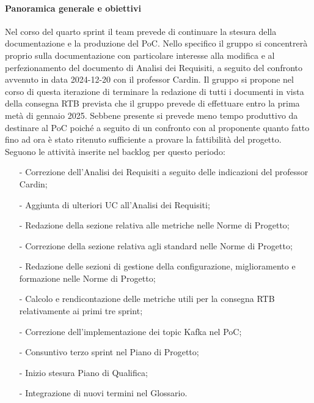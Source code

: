 \documentclass[10pt]{article}
\begin{document}
{{{{{    \paragraph{Panoramica generale e obiettivi}\mbox{}\vspace{0.4em}

    Nel corso del quarto sprint il team prevede di continuare la stesura della documentazione e la produzione del PoC. Nello specifico 
    il gruppo si concentrerà proprio sulla documentazione con particolare interesse alla modifica e al perfezionamento del documento di
    Analisi dei Requisiti, a seguito del confronto avvenuto in data 2024-12-20 con il professor Cardin. Il gruppo si propone nel corso di
    questa iterazione di terminare la redazione di tutti i documenti in vista della consegna RTB prevista che il gruppo prevede di
    effettuare entro la prima metà di gennaio 2025. Sebbene presente si prevede meno tempo produttivo da destinare al PoC poiché a seguito
    di un confronto con al proponente quanto fatto fino ad ora è stato ritenuto sufficiente a provare la fattibilità del progetto.\\
    Seguono le attività inserite nel backlog per questo periodo:
    \vspace{-0.5em}
    \begin{itemize}
    \setlength\itemsep{-0.2em}
    \item [-] Correzione dell'Analisi dei Requisiti a seguito delle indicazioni del professor Cardin;
    \item [-] Aggiunta di ulteriori UC all'Analisi dei Requisiti;
    \item [-] Redazione della sezione relativa alle metriche nelle Norme di Progetto;
    \item [-] Correzione della sezione relativa agli standard nelle Norme di Progetto;
    \item [-] Redazione delle sezioni di gestione della configurazione, miglioramento e formazione nelle Norme di Progetto;
    \item [-] Calcolo e rendicontazione delle metriche utili per la consegna RTB relativamente ai primi tre sprint;
    \item [-] Correzione dell'implementazione dei topic Kafka nel PoC;
    \item [-] Consuntivo terzo sprint nel Piano di Progetto;
    \item [-] Inizio stesura Piano di Qualifica;
    \item [-] Integrazione di nuovi termini nel Glossario.
    \end{itemize}

}}}}}
\end{document}

